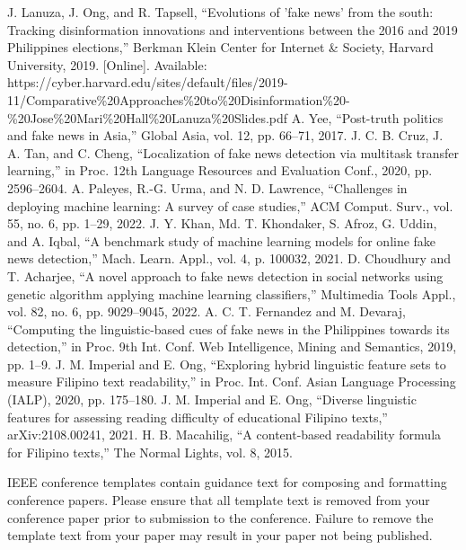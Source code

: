 \documentclass[conference]{IEEEtran}
\begin{document}
\begin{thebibliography}{00}
 J. Lanuza, J. Ong, and R. Tapsell, ``Evolutions of 'fake news' from the south: Tracking disinformation innovations and interventions between the 2016 and 2019 Philippines elections,'' Berkman Klein Center for Internet \& Society, Harvard University, 2019. [Online]. Available: https://cyber.harvard.edu/sites/default/files/2019-11/Comparative\%20Approaches\%20to\%20Disinformation\%20-\%20Jose\%20Mari\%20Hall\%20Lanuza\%20Slides.pdf
 A. Yee, ``Post-truth politics and fake news in Asia,'' Global Asia, vol. 12, pp. 66--71, 2017.
 J. C. B. Cruz, J. A. Tan, and C. Cheng, ``Localization of fake news detection via multitask transfer learning,'' in Proc. 12th Language Resources and Evaluation Conf., 2020, pp. 2596--2604.
 A. Paleyes, R.-G. Urma, and N. D. Lawrence, ``Challenges in deploying machine learning: A survey of case studies,'' ACM Comput. Surv., vol. 55, no. 6, pp. 1--29, 2022.
 J. Y. Khan, Md. T. Khondaker, S. Afroz, G. Uddin, and A. Iqbal, ``A benchmark study of machine learning models for online fake news detection,'' Mach. Learn. Appl., vol. 4, p. 100032, 2021.
 D. Choudhury and T. Acharjee, ``A novel approach to fake news detection in social networks using genetic algorithm applying machine learning classifiers,'' Multimedia Tools Appl., vol. 82, no. 6, pp. 9029--9045, 2022.
 A. C. T. Fernandez and M. Devaraj, ``Computing the linguistic-based cues of fake news in the Philippines towards its detection,'' in Proc. 9th Int. Conf. Web Intelligence, Mining and Semantics, 2019, pp. 1--9.
 J. M. Imperial and E. Ong, ``Exploring hybrid linguistic feature sets to measure Filipino text readability,'' in Proc. Int. Conf. Asian Language Processing (IALP), 2020, pp. 175--180.
 J. M. Imperial and E. Ong, ``Diverse linguistic features for assessing reading difficulty of educational Filipino texts,'' arXiv:2108.00241, 2021.
 H. B. Macahilig, ``A content-based readability formula for Filipino texts,'' The Normal Lights, vol. 8, 2015.
\end{thebibliography}
\vspace{12pt}
\color{red}
IEEE conference templates contain guidance text for composing and formatting conference papers. Please ensure that all template text is removed from your conference paper prior to submission to the conference. Failure to remove the template text from your paper may result in your paper not being published.
\end{document}

